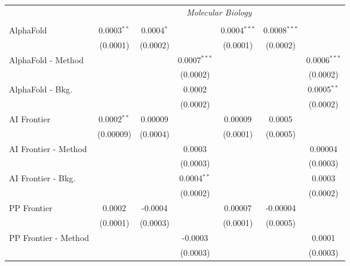 \begin{tabular}{lcccccc}
 & \multicolumn{6}{c}{\textit{Molecular Biology}} \\ \\
   AlphaFold            & 0.0003$^{**}$ & 0.0004$^{*}$ &                & 0.0004$^{***}$ & 0.0008$^{***}$ &   \\   
                        & (0.0001)      & (0.0002)     &                & (0.0001)       & (0.0002)       &   \\   
   AlphaFold - Method   &               &              & 0.0007$^{***}$ &                &                & 0.0006$^{***}$\\   
                        &               &              & (0.0002)       &                &                & (0.0002)\\   
   AlphaFold - Bkg.     &               &              & 0.0002         &                &                & 0.0005$^{**}$\\   
                        &               &              & (0.0002)       &                &                & (0.0002)\\   
   AI Frontier          & 0.0002$^{**}$ & 0.00009      &                & 0.00009        & 0.0005         &   \\   
                        & (0.00009)     & (0.0004)     &                & (0.0001)       & (0.0005)       &   \\   
   AI Frontier - Method &               &              & 0.0003         &                &                & 0.00004\\   
                        &               &              & (0.0003)       &                &                & (0.0003)\\   
   AI Frontier - Bkg.   &               &              & 0.0004$^{**}$  &                &                & 0.0003\\   
                        &               &              & (0.0002)       &                &                & (0.0002)\\   
   PP Frontier          & 0.0002        & -0.0004      &                & 0.00007        & -0.00004       &   \\   
                        & (0.0001)      & (0.0003)     &                & (0.0001)       & (0.0005)       &   \\   
   PP Frontier - Method &               &              & -0.0003        &                &                & 0.0001\\   
                        &               &              & (0.0003)       &                &                & (0.0003)\\   

\end{tabular}
